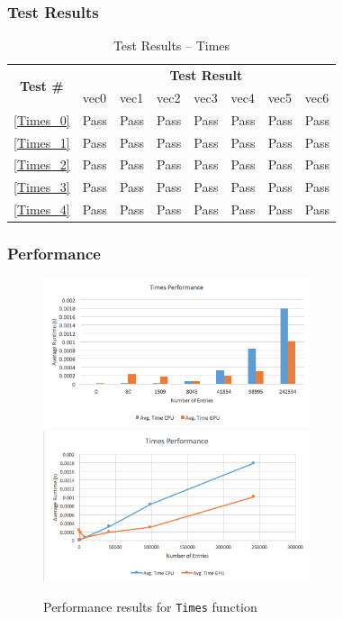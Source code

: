 \documentclass[12pt]{article}
\begin{document}
	\subsubsection{Test Results}
		\begin{table}[H]
		\centering
		\caption{Test Results -- Times}\label{Times_acc}
		\begin{tabular}{clllllll}
		\toprule
		\multirow{2}{*}{\bf Test \#} & \multicolumn{7}{c}{\bf Test Result}\\
		& vec0 & vec1 & vec2 & vec3 & vec4 & vec5 & vec6\\\midrule
		\ref{Times_0} & Pass & Pass & Pass & Pass & Pass & Pass & Pass\\
		\ref{Times_1} & Pass & Pass & Pass & Pass & Pass & Pass & Pass\\
		\ref{Times_2} & Pass & Pass & Pass & Pass & Pass & Pass & Pass\\
		\ref{Times_3} & Pass & Pass & Pass & Pass & Pass & Pass & Pass\\
		\ref{Times_4} & Pass & Pass & Pass & Pass & Pass & Pass & Pass\\
		\bottomrule
		\end{tabular}
		\end{table}

	\subsubsection{Performance}
    	\begin{figure}[H]
    	\centering
    	\caption{Performance results for \texttt{Times} function}\label{figPerformanceTimes}
    	\includegraphics[width=0.7\textwidth]{times_bar.png}
    	\includegraphics[width=0.7\textwidth]{times_line.png}
    	\end{figure}
\end{document}
